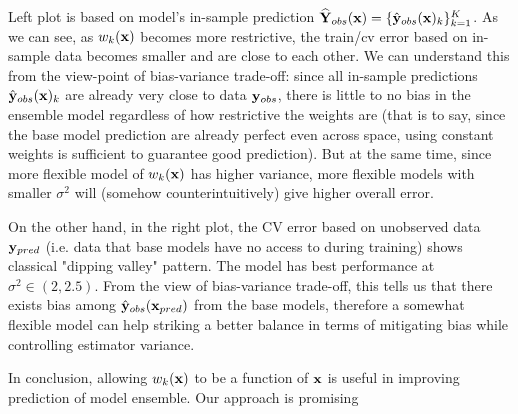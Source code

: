 \documentclass[11pt]{article}
\theoremstyle{definition}
\begin{document}
Left plot is based on model's in-sample prediction $\widehat{{\bf Y}}_{obs}({\bf x}) = \{\hat{{\bf y}}_{obs}({\bf x})_{k}\}_{k=1}^K$. As we can see, as $w_k({\bf x})$ becomes more restrictive, the train/cv error based on in-sample data becomes smaller and are close to each other. We can understand this from the view-point of bias-variance trade-off: since all in-sample predictions $\hat{{\bf y}}_{obs}({\bf x})_{k}$ are already very close to data ${\bf y}_{obs}$, there is little to no  bias in the ensemble model regardless of how restrictive the weights are (that is to say, since the base model prediction are already perfect even across space, using constant weights is sufficient to guarantee good prediction). But at the same time, since more flexible model of $w_k({\bf x})$ has higher variance, more flexible models with smaller $\sigma^2$ will (somehow counterintuitively) give higher overall error.

On the other hand, in the right plot, the CV error based on unobserved data ${\bf y}_{pred}$ (i.e. data that base models have no access to during training) shows classical "dipping valley" pattern. The model has best performance at $\sigma^2 \in (2, 2.5)$. From the view of bias-variance trade-off, this tells us that there exists bias among $\hat{{\bf y}}_{obs}({\bf x}_{pred})$ from the base models, therefore a somewhat flexible model can help striking a better balance in terms of mitigating bias while controlling estimator variance.

In conclusion, allowing $w_k({\bf x})$ to be a function of ${\bf x}$ is useful in improving prediction of model ensemble. Our approach is promising



\newpage
\end{document}
